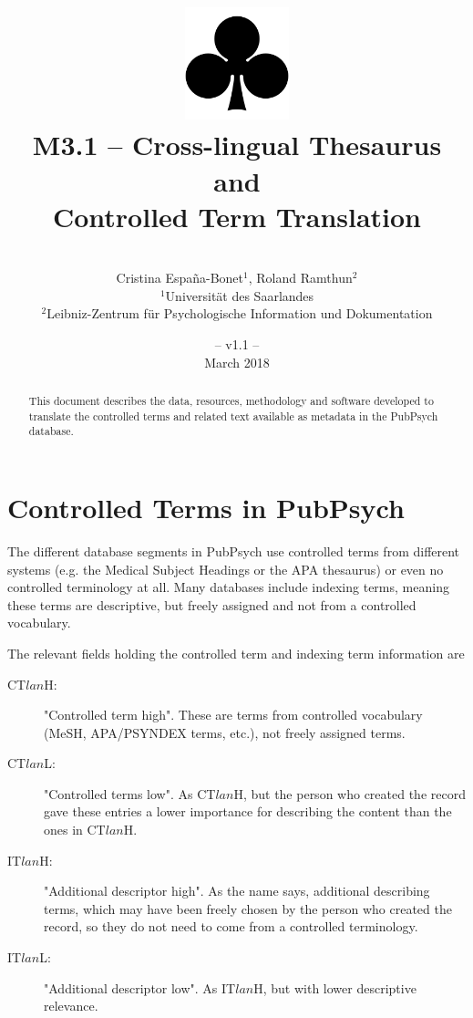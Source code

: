 \documentclass[a4paper,11pt]{article}
\title{
	\includegraphics[width=3cm]{./img/200px-SuitClubs.png} \\
	\Huge M3.1 -- Cross-lingual Thesaurus and \\ Controlled Term Translation \\ 
}
\author{\vspace*{1cm}\\ \LARGE Cristina Espa\~na-Bonet$^{1}$, Roland Ramthun$^{2}$ \medskip \\ 
	\Large $^{1}$Universit\"at des Saarlandes\\ \Large $^{2}$Leibniz-Zentrum für Psychologische Information und Dokumentation}
\date{\vspace*{2cm} -- v1.1 --\\March 2018}
\begin{document}
	
	\clearpage\maketitle
	\thispagestyle{empty}
	
	\vspace*{5cm}
	\begin{abstract}
		This document describes the data, resources, methodology and software developed to translate the controlled terms and related text available as metadata in the PubPsych database.
	\end{abstract}
	
	\newpage
	\tableofcontents
	\clearpage
	
	
	
	\section{Controlled Terms in PubPsych}
	\label{s:ct}
	
	The different database segments in PubPsych use controlled terms from different systems (e.g. the Medical Subject Headings or the APA thesaurus) or even no controlled terminology at all. Many databases include indexing terms, meaning these terms are descriptive, but freely assigned and not from a controlled vocabulary.
	
	\bigskip
	\noindent The relevant fields holding the controlled term and indexing term information are
		\begin{description}
		\item[CT\mbox{\boldmath $lan$}H:] "Controlled term high". These are terms from controlled vocabulary (MeSH, APA/PSYNDEX terms, etc.), not freely assigned terms.
		\item[CT\mbox{\boldmath $lan$}L:] "Controlled terms low". As CT$lan$H, but the person who created the record gave these entries a lower importance for describing the content than the ones in CT$lan$H.
		\item[IT\mbox{\boldmath $lan$}H:] "Additional descriptor high". As the name says, additional describing terms, which may have been freely chosen by the person who created the record, so they do not need to come from a controlled terminology.
		\item[IT\mbox{\boldmath $lan$}L:] "Additional descriptor low". As IT$lan$H, but with lower descriptive relevance.
	\end{description}
	
\end{document}
